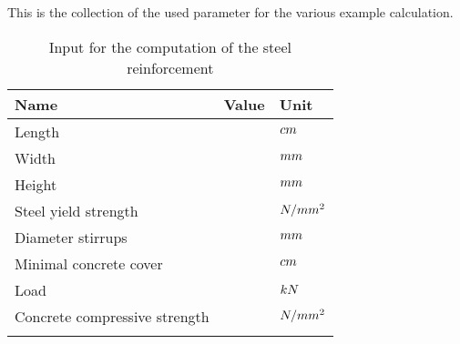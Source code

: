 This is the collection of the used parameter for the various example calculation.
\begin{table}[ht]
	\begin{center}
		\begin{minipage}{.9\textwidth}
			\caption{Input for the computation of the steel reinforcement}\label{tab:beamdesigninput}
			\begin{tabular}{lrl}
				\toprule
				Name &  Value&Unit\\
				\midrule
				Length & \beamExSpan &$cm$\\
				Width & \beamExWidth &$mm$\\
				Height& \beamExHeightC &$mm$\\
				Steel yield strength& \beamExYieldStrSteel &$N/mm^2$\\
				Diameter stirrups& \beamExSteelDiaBu &$mm$\\
				Minimal concrete cover& \beamExCoverMin &$cm$\\
				Load& \beamExPointLoadC &$kN$\\
				Concrete compressive strength& \beamExComprStrConcreteC &$N/mm^2$\\
				\botrule
			\end{tabular}
		\end{minipage}
	\end{center}
\end{table}